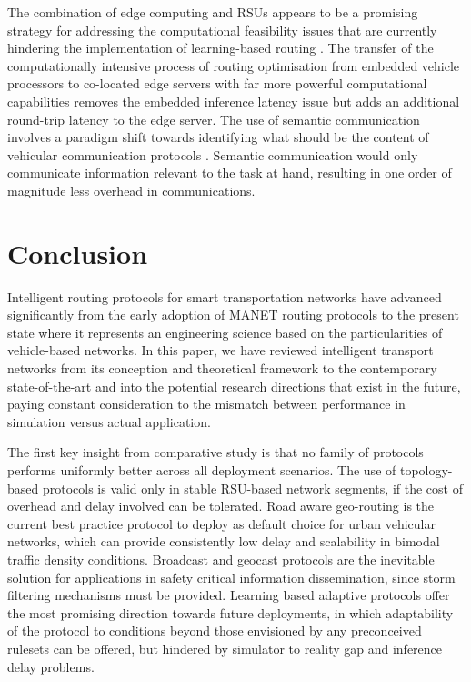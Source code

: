 \documentclass[12pt]{article}
\begin{document}
The combination of edge computing and RSUs appears to be a promising strategy for addressing the computational feasibility issues that are currently hindering the implementation of learning-based routing \cite{karagiannis2011vehicular}. The transfer of the computationally intensive process of routing optimisation from embedded vehicle processors to co-located edge servers with far more powerful computational capabilities removes the embedded inference latency issue but adds an additional round-trip latency to the edge server. The use of semantic communication involves a paradigm shift towards identifying what should be the content of vehicular communication protocols \cite{dressler2018not}. Semantic communication would only communicate information relevant to the task at hand, resulting in one order of magnitude less overhead in communications.


\section{Conclusion}

Intelligent routing protocols for smart transportation networks have advanced significantly from the early adoption of MANET routing protocols to the present state where it represents an engineering science based on the particularities of vehicle-based networks. In this paper, we have reviewed intelligent transport networks from its conception and theoretical framework to the contemporary state-of-the-art and into the potential research directions that exist in the future, paying constant consideration to the mismatch between performance in simulation versus actual application.

The first key insight from comparative study is that no family of protocols performs uniformly better across all deployment scenarios. The use of topology-based protocols is valid only in stable RSU-based network segments, if the cost of overhead and delay involved can be tolerated. Road aware geo-routing is the current best practice protocol to deploy as default choice for urban vehicular networks, which can provide consistently low delay and scalability in bimodal traffic density conditions. Broadcast and geocast protocols are the inevitable solution for applications in safety critical information dissemination, since storm filtering mechanisms must be provided. Learning based adaptive protocols offer the most promising direction towards future deployments, in which adaptability of the protocol to conditions beyond those envisioned by any preconceived rulesets can be offered, but hindered by simulator to reality gap and inference delay problems.
\end{document}
